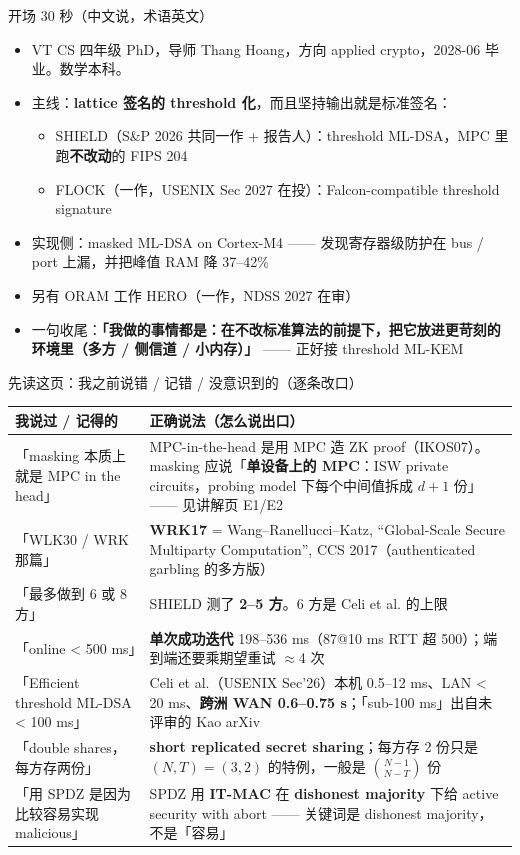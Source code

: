 \documentclass[aspectratio=169,10pt,fontset=none]{ctexbeamer}
\begin{document}
\begin{frame}{开场 30 秒（中文说，术语英文）}
\begin{itemize}
  \item VT CS 四年级 PhD，导师 Thang Hoang，方向 applied crypto，2028-06 毕业。数学本科。
  \item 主线：\textbf{lattice 签名的 threshold 化}，而且坚持\alert{输出就是标准签名}：
  \begin{itemize}
    \item SHIELD（S\&P 2026 共同一作 + 报告人）：threshold ML-DSA，MPC 里跑\textbf{不改动}的 FIPS 204
    \item FLOCK（一作，USENIX Sec 2027 在投）：Falcon-compatible threshold signature
  \end{itemize}
  \item 实现侧：masked ML-DSA on Cortex-M4 —— 发现寄存器级防护在 bus / port 上漏，并把峰值 RAM 降 37--42\%
  \item 另有 ORAM 工作 HERO（一作，NDSS 2027 在审）
  \item 一句收尾：\textbf{「我做的事情都是：在不改标准算法的前提下，把它放进更苛刻的环境里（多方 / 侧信道 / 小内存）」} —— 正好接 threshold ML-KEM
\end{itemize}
\end{frame}
\begin{frame}{先读这页：我之前说错 / 记错 / 没意识到的（逐条改口）}
{\small\renewcommand{\arraystretch}{1.2}
\begin{tabularx}{\textwidth}{@{}p{4.4cm}Y@{}}\toprule
\textbf{我说过 / 记得的} & \textbf{正确说法（怎么说出口）} \\\midrule
「masking 本质上就是 MPC in the head」 & \alert{MPC-in-the-head 是用 MPC 造 ZK proof}（IKOS07）。masking 应说「\textbf{单设备上的 MPC}：ISW private circuits，probing model 下每个中间值拆成 $d+1$ 份」—— 见讲解页 E1/E2 \\
「WLK30 / WRK 那篇」 & \textbf{WRK17} = Wang--Ranellucci--Katz, ``Global-Scale Secure Multiparty Computation'', CCS 2017（authenticated garbling 的多方版）\\
「最多做到 6 或 8 方」 & SHIELD 测了 \textbf{2--5 方}。6 方是 Celi et al. 的上限 \\
「online < 500 ms」 & \textbf{单次成功迭代} 198--536 ms（87@10 ms RTT 超 500）；端到端还要乘期望重试 $\approx$4 次 \\
「Efficient threshold ML-DSA < 100 ms」 & Celi et al.（USENIX Sec'26）本机 0.5--12 ms、LAN < 20 ms、\textbf{跨洲 WAN 0.6--0.75 s}；「sub-100 ms」出自未评审的 Kao arXiv \\
「double shares，每方存两份」 & \textbf{short replicated secret sharing}；每方存 2 份只是 $(N,T)=(3,2)$ 的特例，一般是 $\binom{N-1}{N-T}$ 份 \\
「用 SPDZ 是因为比较容易实现 malicious」 & SPDZ 用 \textbf{IT-MAC} 在 \textbf{dishonest majority} 下给 active security with abort —— 关键词是 dishonest majority，不是「容易」\\
\bottomrule
\end{tabularx}}
\end{frame}
\end{document}
